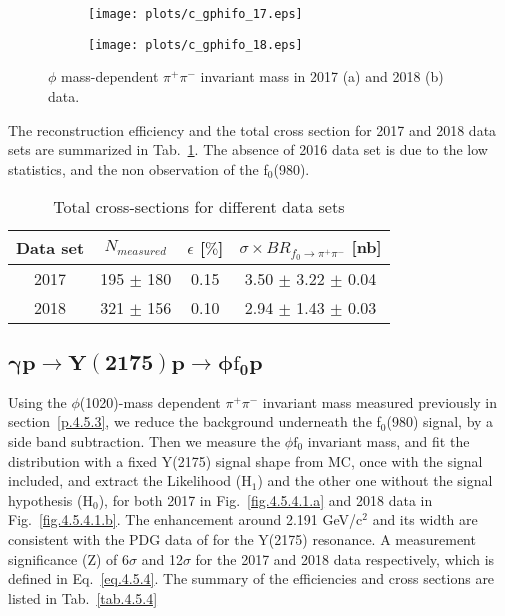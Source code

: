 \begin{figure}[H]
    \centering
    \begin{subfigure}[b]{0.45\textwidth}
        \texttt{[image: plots/c\_gphifo\_17.eps]}
        \caption{}
        \label{fig.4.5.3.1.a}
    \end{subfigure}
    \begin{subfigure}[b]{0.45\textwidth}
        \texttt{[image: plots/c\_gphifo\_18.eps]}
        \caption{}
        \label{fig.4.5.3.1.b}
    \end{subfigure}
    \caption{$\phi$ mass-dependent $\pi^+ \pi^-$ invariant mass in 2017 (a) and 2018 (b) data.}
    \label{fig.4.5.3.1}
\end{figure}

The reconstruction efficiency and the total cross section for 2017 and 2018 data sets are summarized in Tab.~\ref{tab.4.5.3}.
The absence of 2016 data set is due to the low statistics, and the non observation of the f$_0$(980).

\begin{table}[!htbp]
    \centering
    \caption{Total cross-sections for different data sets}
    \label{tab.4.5.3}
    \begin{tabular}{|c|c|c|c|}
        \hline
        Data set & $N_{measured}$ & $\epsilon$ [$\%$] & $\sigma \times BR_{f_{0}\rightarrow\pi^{+}\pi^{-}}$ [nb] \\
        \hline
        2017 & 195 $\pm$ 180 & 0.15 & 3.50 $\pm$ 3.22 $\pm$ 0.04 \\
        \hline
        2018 & 321 $\pm$ 156 & 0.10 & 2.94 $\pm$ 1.43 $\pm$ 0.03 \\
        \hline
    \end{tabular}
\end{table}

\subsection{\texorpdfstring{$\bm{\gamma p \rightarrow Y(2175) p \rightarrow \phi \mathrm{f}_0 p}$}{}}
\label{p.4.5.4}

Using the $\phi$(1020)-mass dependent $\pi^+ \pi^-$ invariant mass measured previously in section~\ref{p.4.5.3}, we reduce the background underneath the f$_0$(980) signal, by a side band subtraction. Then we measure the $\phi \mathrm{f}_0$ invariant mass, and fit the distribution with a fixed Y(2175) signal shape from MC, once with the signal included, and extract the Likelihood (H$_1$) and the other one without the signal hypothesis (H$_0$), for both 2017 in Fig.~\ref{fig.4.5.4.1.a} and 2018 data in Fig.~\ref{fig.4.5.4.1.b}. The enhancement around 2.191 GeV/c$^2$ and its width are consistent with the PDG data of for the Y(2175) resonance. A measurement significance (Z) of 6$\sigma$ and 12$\sigma$ for the 2017 and 2018 data respectively, which is defined in Eq.~\ref{eq.4.5.4}. The summary of the efficiencies and cross sections are listed in Tab.~\ref{tab.4.5.4}

